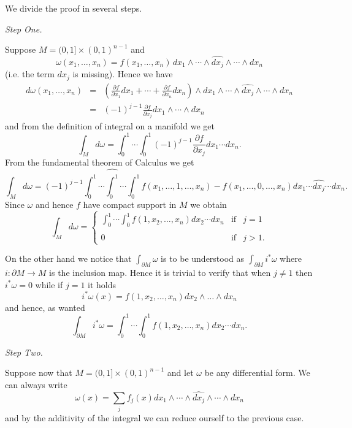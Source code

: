 \documentclass[12pt]{article}
\begin{document}
We divide the proof in several steps.

\emph{Step One.}

Suppose $M=(0,1]\times (0,1)^{n-1}$ and 
\[
        \omega(x_1,\ldots,x_n)=f(x_1,\ldots,x_n)\, d
        x_1\wedge\cdots\wedge \widehat{d x_j}\wedge \cdots \wedge d
        x_n
\]
(i.e. the term $dx_j$ is missing).
Hence we have
\begin{eqnarray*}
        d\omega(x_1,\ldots,x_n)
        &=&
        \left(\frac{\partial f}{\partial x_1} d x_1+\cdots +\frac{\partial
        f}{\partial x_n}d x_n\right)\wedge d x_1\wedge \cdots \wedge
        \widehat{d x_j}\wedge \cdots \wedge d x_n \\
        &=& (-1)^{j-1} \frac{\partial f}{\partial x_j} d x_1\wedge
        \cdots \wedge d x_n
\end{eqnarray*}
and from the definition of integral on a manifold we get
\[
        \int_M d\omega
        = \int_0^1\cdots \int_0^1 (-1)^{j-1} \frac{\partial
f}{\partial x_j} d x_1 \cdots d x_n.
\]
From the fundamental theorem of Calculus we get
\[
        \int_M d\omega
        =(-1)^{j-1}
        \int_0^1\cdots\widehat{\int_0^1}\cdots\int_0^1
        f(x_1,\ldots,1,\ldots,x_n)-f(x_1,\ldots,0,\ldots,x_n) d
        x_1\cdots \widehat{ d x_j}\cdots d x_n.
\]
Since $\omega$ and hence  $f$ have compact support in $M$ we obtain
\[
        \int_M d\omega=\left\{
        \begin{array}{lcl}
                \int_0^1\cdots\int_0^1 f(1,x_2,\ldots,x_n) d x_2
        \cdots d x_n & \text{if} & j=1 \\\\
                0 &\text{if} & j>1 .
        \end{array}\right.
\]

On the other hand we notice that
 $\int_{\partial M}\omega$
is to be understood as $\int_{\partial M}i^* \omega$ where
$i:\partial M\to M$ is the inclusion map.
Hence it is trivial to verify that when $j\neq 1$ then $i^*\omega=0$ 
while if $j=1$ it holds
\[
        i^*\omega(x) = f(1,x_2,\ldots,x_n) d x_2\wedge\ldots\wedge d x_n
\]
and hence, as wanted
\[
        \int_{\partial M}i^*\omega
        = \int_0^1\cdots\int_0^1 f(1,x_2,\ldots,x_n) d x_2 \cdots d x_n.
\]

\emph{Step Two.}

Suppose now that $M=(0,1]\times (0,1)^{n-1}$ and let $\omega$ be any differential form.
We can always write
        \[
        \omega(x)=\sum_j f_j(x) d x_1 \wedge\cdots \wedge \widehat{
d x_j} \wedge \cdots \wedge d x_n
        \]
and by the additivity of the integral we can reduce ourself to the previous case.
\end{document}
